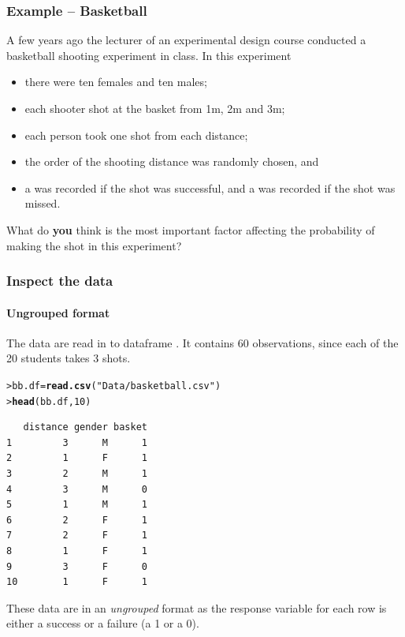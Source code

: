 \documentclass{beamer}\usepackage[]{graphicx}\usepackage[]{xcolor}
\makeatletter
\newcommand{\hlnum}[1]{\textcolor[rgb]{0.686,0.059,0.569}{#1}}%
\newcommand{\hlstr}[1]{\textcolor[rgb]{0.192,0.494,0.8}{#1}}%
\newcommand{\hlstd}[1]{\textcolor[rgb]{0.345,0.345,0.345}{#1}}%
\newcommand{\hlkwb}[1]{\textcolor[rgb]{0.69,0.353,0.396}{#1}}%
\newcommand{\hlkwd}[1]{\textcolor[rgb]{0.737,0.353,0.396}{\textbf{#1}}}%
\newenvironment{kframe}{%
 \def\at@end@of@kframe{}%
 \ifinner\ifhmode%
  \def\at@end@of@kframe{\end{minipage}}%
  \begin{minipage}{\columnwidth}%
 \fi\fi%
 \def\FrameCommand##1{\hskip\@totalleftmargin \hskip-\fboxsep
 \colorbox{shadecolor}{##1}\hskip-\fboxsep
     \hskip-\linewidth \hskip-\@totalleftmargin \hskip\columnwidth}%
 \MakeFramed {\advance\hsize-\width
   \@totalleftmargin\z@ \linewidth\hsize
   \@setminipage}}%
 {\par\unskip\endMakeFramed%
 \at@end@of@kframe}
\newenvironment{knitrout}{}{} %
\makeatother
\begin{document}



\begin{frame}
\frametitle{Example -- Basketball}
A few years ago the lecturer of an experimental design course conducted a basketball shooting experiment in class. In this experiment
\begin{itemize}
  \item there were ten females and ten males;
  \item each shooter shot at the basket from 1m, 2m and 3m;
  \item each person took one shot from each distance;
  \item the order of the shooting distance was randomly chosen, and 
\item a  was recorded if the shot was successful, and a  was recorded if the shot was missed.
\end{itemize}

\medskip

What do \textbf{you} think is the most important factor affecting the probability of making the shot in this experiment?
\end{frame}



\begin{frame}[fragile]
\frametitle{Inspect the data}
\framesubtitle{Ungrouped format}
The data are read in to dataframe . It contains 60 observations, since each of the 20 students takes 3 shots.

\begin{knitrout}\scriptsize
{}\color{fgcolor}\begin{kframe}
\begin{alltt}
\hlstd{> }\hlstd{bb.df} \hlkwb{=} \hlkwd{read.csv}\hlstd{(}\hlstr{"Data/basketball.csv"}\hlstd{)}
\hlstd{> }\hlkwd{head}\hlstd{(bb.df,} \hlnum{10}\hlstd{)}
\end{alltt}
\begin{verbatim}
   distance gender basket
1         3      M      1
2         1      F      1
3         2      M      1
4         3      M      0
5         1      M      1
6         2      F      1
7         2      F      1
8         1      F      1
9         3      F      0
10        1      F      1
\end{verbatim}
\end{kframe}
\end{knitrout}
\bigskip

These data are in an \emph{ungrouped} format as the response variable for each row is either a success or a failure (a 1 or a 0).

\end{frame}
\end{document}
